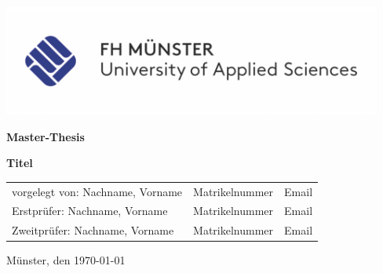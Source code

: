 \thispagestyle{empty}
\setlength{\unitlength}{1cm}
\hfill



\vspace{0.2cm}
	
\begin{center}
	\includegraphics[scale=1.2]{assets/fh_logo.png}
\end{center}

\vspace{1.5cm}	

\begin{minipage}[t]{14cm}
	\begin{center}		
		\begin{Huge}\textsf{\textbf{Master-Thesis}}\\\end{Huge}
	\end{center}
\end{minipage}
	
	\vspace{1.5cm}
	
\begin{minipage}[t]{14cm}	
	\begin{center}						
		\begin{huge}
			\textbf{Titel} \\
		\end{huge}
				
		\vspace{2cm}
		
		\begin{large}
			\begin{tabular}{lcl}
				vorgelegt von: Nachname, Vorname& Matrikelnummer & Email \\
				Erstprüfer: Nachname, Vorname& Matrikelnummer & Email \\
				Zweitprüfer: Nachname, Vorname& Matrikelnummer & Email \\
			\end{tabular}
	
			\vspace{2cm}
		
				Münster, den \today
			
		\end{large}
	\end{center}
\end{minipage}

\restoregeometry